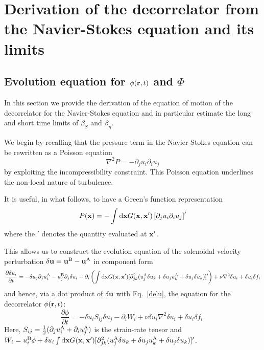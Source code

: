 \documentclass[amsmath,amssymb,amsbsy,pre,twocolumn,tightenlines,superscriptaddress,floatfix]{revtex4-2}
\begin{document}
\section{Derivation of the decorrelator from the Navier-Stokes equation and its limits} \label{Phi_derivation}
\renewcommand{\theequation}{B-\arabic{equation}}
\setcounter{equation}{0}
\subsection{Evolution equation for $\phi({\bf r},t)$ and $\Phi$}
In this section we provide the derivation of the equation of motion of the decorrelator for the Navier-Stokes equation and
in particular estimate the long and short time limits of $\beta_S$ and $\beta_\eta$.

We begin by recalling that the pressure term in the Navier-Stokes equation can be rewritten as a Poisson equation
\begin{equation}
\nabla^2 P = - {\partial_j u_i}{\partial_i u_j}
\end{equation}
by exploiting the incompressibility constraint. This Poisson equation underlines the non-local nature of turbulence.

It is useful, in what follows, to have a Green's function representation
\begin{equation}
	P({\bf x}) = -\int {\rm d}{\bf x} G({\bf x},{\bf x}^\prime)
	\left [{\partial_j u_i}{\partial_i u_j}\right ]^\prime
\end{equation}
	where the $\prime$ denotes the quantity evaluated at ${\bf x}^\prime$.

This allows us to construct the
evolution equation of the solenoidal
velocity perturbation $\delta {\bf u} = {\bf u}^{\rm B} - {\bf u}^{\rm A}$ in component form
\begin{equation}
\frac{\partial \delta u_i}{\partial t} = - \delta u_j \partial_j u_i^{\rm A} - u_j^{\rm B} \partial_j \delta u_i
-  \partial_i \left(\int {\rm d}{\bf x}
G({\bf x},{\bf x'}) [\partial^2_{jk} (u_j^{\rm A}\delta u_k +\delta u_j u_k^{\rm A} + \delta u_j\delta u_k)]'\right) + \nu \nabla^2 \delta u_i + \delta u_i \delta f_{i}
\label{delu}
\end{equation}
and hence, via a dot product of  $\delta {\bf u}$ with Eq.~\eqref{delu}, the equation for
the decorrelator $\phi ({\bf r},t)$:
\begin{equation}
\frac{\partial \phi}{\partial t} = - \delta u_i S_{ij} \delta u_j
-  \partial_i W_i + \nu \delta u _i\nabla^2 \delta u_i + \delta u_i \delta f_{i}.
\label{phi_resolved}
\end{equation}
Here, $S_{ij} = \frac{1}{2}  (\partial_j u_i^{\rm A} + \partial_i u_j^{\rm A})$ is the strain-rate tensor
and $W_i = u_i^{\rm B} \phi + \delta u_i\int {\rm d}{\bf x}
G({\bf x},{\bf x'}) [\partial^2_{jk} (u_j^{\rm A}\delta u_k +\delta u_j u_k^{\rm A} + \delta u_j\delta u_k)]'$.
\end{document}
